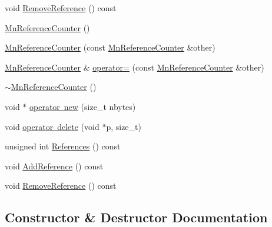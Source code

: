 \begin{DoxyCompactItemize}
void \mbox{\hyperlink{classROOT_1_1Minuit2_1_1MnReferenceCounter_a243db2ef8fc1fab0a29ea1c83aececab}{Remove\+Reference}} () const
\item 
\mbox{\hyperlink{classROOT_1_1Minuit2_1_1MnReferenceCounter_a9d841e3e0752316d6f4988b995d834b8}{Mn\+Reference\+Counter}} ()
\item 
\mbox{\hyperlink{classROOT_1_1Minuit2_1_1MnReferenceCounter_ac12866f9e41be0b9f943326772eee89a}{Mn\+Reference\+Counter}} (const \mbox{\hyperlink{classROOT_1_1Minuit2_1_1MnReferenceCounter}{Mn\+Reference\+Counter}} \&other)
\item 
\mbox{\hyperlink{classROOT_1_1Minuit2_1_1MnReferenceCounter}{Mn\+Reference\+Counter}} \& \mbox{\hyperlink{classROOT_1_1Minuit2_1_1MnReferenceCounter_a6a952f3f15d5dcfa10647c9df13a7caa}{operator=}} (const \mbox{\hyperlink{classROOT_1_1Minuit2_1_1MnReferenceCounter}{Mn\+Reference\+Counter}} \&other)
\item 
\mbox{\hyperlink{classROOT_1_1Minuit2_1_1MnReferenceCounter_ab78e13c79097fd8f5983dada7fab2f3d}{$\sim$\+Mn\+Reference\+Counter}} ()
\item 
void $\ast$ \mbox{\hyperlink{classROOT_1_1Minuit2_1_1MnReferenceCounter_af7e9fdee3f67cac68328bbd05f6f2958}{operator new}} (size\+\_\+t nbytes)
\item 
void \mbox{\hyperlink{classROOT_1_1Minuit2_1_1MnReferenceCounter_a792b5f277bb7df7c032c603eed5ae6f9}{operator delete}} (void $\ast$p, size\+\_\+t)
\item 
unsigned int \mbox{\hyperlink{classROOT_1_1Minuit2_1_1MnReferenceCounter_a8c4e8a4427e3f5eeaad4001a364f8a5a}{References}} () const
\item 
void \mbox{\hyperlink{classROOT_1_1Minuit2_1_1MnReferenceCounter_afab040d933d93fd7f86b3c14a8d1910d}{Add\+Reference}} () const
\item 
void \mbox{\hyperlink{classROOT_1_1Minuit2_1_1MnReferenceCounter_a243db2ef8fc1fab0a29ea1c83aececab}{Remove\+Reference}} () const
\end{DoxyCompactItemize}


\subsection{Constructor \& Destructor Documentation}
\mbox{\label{classROOT_1_1Minuit2_1_1MnReferenceCounter_a9d841e3e0752316d6f4988b995d834b8}} 
